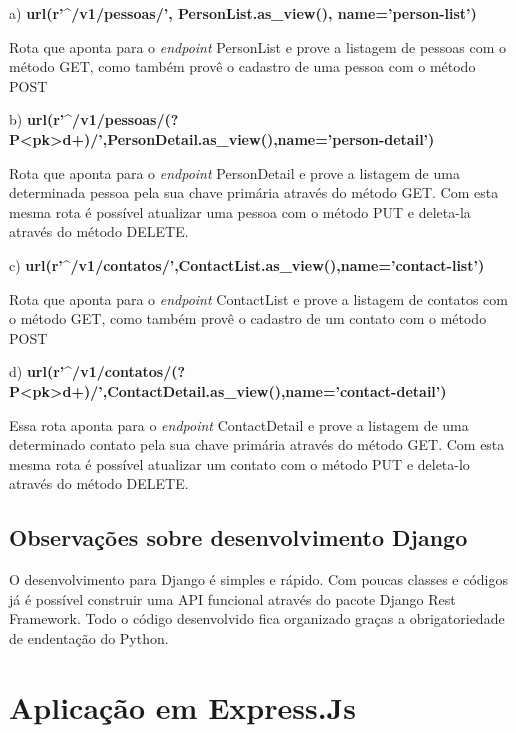   \begin{compactitem}
    \item[a)] \textbf{url(r'\^{}/v1/pessoas/', PersonList.as\_view(), name='person-list')}
    
    Rota que aponta para o \textit{endpoint} PersonList e prove a listagem de pessoas com o método GET, como também
    provê o cadastro de uma pessoa com o método POST
    
    \item[b)] \textbf{url(r'\^{}/v1/pessoas/(?P<pk>d+)/',PersonDetail.as\_view(),name='person-detail')}
    
    Rota que aponta para o \textit{endpoint} PersonDetail e prove a listagem de uma determinada pessoa pela sua chave primária
    através do método GET. Com esta mesma rota é possível atualizar uma pessoa com o método PUT e deleta-la através do 
    método DELETE.
        
    \item[c)] \textbf{url(r'\^{}/v1/contatos/',ContactList.as\_view(),name='contact-list')}
    
    Rota que aponta para o \textit{endpoint} ContactList e prove a listagem de contatos com o método GET, como também
    provê o cadastro de um contato com o método POST
    
    \item[d)] \textbf{url(r'\^{}/v1/contatos/(?P<pk>d+)/',ContactDetail.as\_view(),name='contact-detail')}
    
    Essa rota aponta para o \textit{endpoint} ContactDetail e prove a listagem de uma determinado contato pela sua chave primária
    através do método GET. Com esta mesma rota é possível atualizar um contato com o método PUT e deleta-lo através do 
    método DELETE.
        
  \end{compactitem}
  

\subsection{Observações sobre desenvolvimento Django}

   O desenvolvimento para Django é simples e rápido. Com poucas classes e códigos já é possível construir uma API funcional
   através do pacote Django Rest Framework. Todo o código desenvolvido fica organizado graças a obrigatoriedade de endentação
   do Python.

\section{Aplicação em Express.Js}
\label{desenvolvimento-node}

